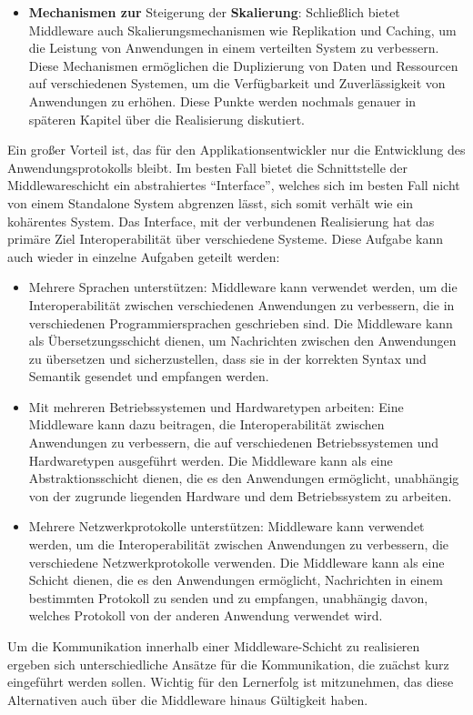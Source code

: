\documentclass[../vs-script-first-v01.tex]{subfiles}
\begin{document}
\begin{itemize}
\item \textbf{Mechanismen zur} Steigerung der \textbf{Skalierung}: Schließlich bietet Middleware auch Skalierungsmechanismen wie Replikation und Caching, um die Leistung von Anwendungen in einem verteilten System zu verbessern. Diese Mechanismen ermöglichen die Duplizierung von Daten und Ressourcen auf verschiedenen Systemen, um die Verfügbarkeit und Zuverlässigkeit von Anwendungen zu erhöhen. Diese Punkte werden nochmals genauer in späteren Kapitel über die Realisierung diskutiert.
\end{itemize}
Ein großer Vorteil ist, das für den Applikationsentwickler nur die Entwicklung des Anwendungsprotokolls bleibt. Im besten Fall bietet die Schnittstelle der Middlewareschicht ein abstrahiertes \enquote{Interface}, welches sich im besten Fall nicht von einem Standalone System abgrenzen lässt, sich somit verhält wie ein kohärentes System. Das Interface, mit der verbundenen Realisierung hat das primäre Ziel Interoperabilität über verschiedene Systeme. Diese Aufgabe kann auch wieder in einzelne Aufgaben geteilt werden: 
\begin{itemize}
\item Mehrere Sprachen unterstützen: Middleware kann verwendet werden, um die Interoperabilität zwischen verschiedenen Anwendungen zu verbessern, die in verschiedenen Programmiersprachen geschrieben sind. Die Middleware kann als Übersetzungsschicht dienen, um Nachrichten zwischen den Anwendungen zu übersetzen und sicherzustellen, dass sie in der korrekten Syntax und Semantik gesendet und empfangen werden.
\item Mit mehreren Betriebssystemen und Hardwaretypen arbeiten: Eine Middleware kann dazu beitragen, die Interoperabilität zwischen Anwendungen zu verbessern, die auf verschiedenen Betriebssystemen und Hardwaretypen ausgeführt werden. Die Middleware kann als eine Abstraktionsschicht dienen, die es den Anwendungen ermöglicht, unabhängig von der zugrunde liegenden Hardware und dem Betriebssystem zu arbeiten.
\item Mehrere Netzwerkprotokolle unterstützen: Middleware kann verwendet werden, um die Interoperabilität zwischen Anwendungen zu verbessern, die verschiedene Netzwerkprotokolle verwenden. Die Middleware kann als eine Schicht dienen, die es den Anwendungen ermöglicht, Nachrichten in einem bestimmten Protokoll zu senden und zu empfangen, unabhängig davon, welches Protokoll von der anderen Anwendung verwendet wird.
\end{itemize}
Um die Kommunikation innerhalb einer Middleware-Schicht zu realisieren ergeben sich unterschiedliche Ansätze für die Kommunikation, die zuächst kurz eingeführt werden sollen. Wichtig für den Lernerfolg ist mitzunehmen, das diese Alternativen auch über die Middleware hinaus Gültigkeit haben.  
\end{document}
